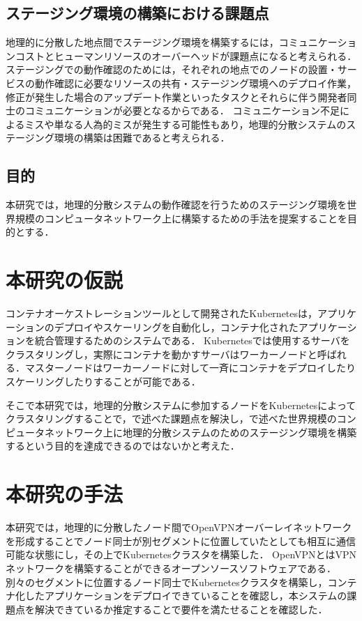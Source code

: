 \subsection{ステージング環境の構築における課題点}
地理的に分散した地点間でステージング環境を構築するには，コミュニケーションコストとヒューマンリソースのオーバーヘッドが課題点になると考えられる．
ステージングでの動作確認のためには，それぞれの地点でのノードの設置・サービスの動作確認に必要なリソースの共有・ステージング環境へのデプロイ作業，修正が発生した場合のアップデート作業といったタスクとそれらに伴う開発者同士のコミュニケーションが必要となるからである．
コミュニケーション不足によるミスや単なる人為的ミスが発生する可能性もあり，地理的分散システムのステージング環境の構築は困難であると考えられる．

\subsection{目的}
本研究では，地理的分散システムの動作確認を行うためのステージング環境を世界規模のコンピュータネットワーク上に構築するための手法を提案することを目的とする．

\section{本研究の仮説}
コンテナオーケストレーションツールとして開発されたKubernetesは，アプリケーションのデプロイやスケーリングを自動化し，コンテナ化されたアプリケーションを統合管理するためのシステムである．
Kubernetesでは使用するサーバをクラスタリングし，実際にコンテナを動かすサーバはワーカーノードと呼ばれる．マスターノードはワーカーノードに対して一斉にコンテナをデプロイしたりスケーリングしたりすることが可能である．

そこで本研究では，地理的分散システムに参加するノードをKubernetesによってクラスタリングすることで，{}で述べた課題点を解決し，{}で述べた世界規模のコンピュータネットワーク上に地理的分散システムのためのステージング環境を構築するという目的を達成できるのではないかと考えた．

\section{本研究の手法}
本研究では，地理的に分散したノード間でOpenVPNオーバーレイネットワークを形成することでノード同士が別セグメントに位置していたとしても相互に通信可能な状態にし，その上でKubernetesクラスタを構築した．
OpenVPNとはVPNネットワークを構築することができるオープンソースソフトウェアである．
別々のセグメントに位置するノード同士でKubernetesクラスタを構築し，コンテナ化したアプリケーションをデプロイできていることを確認し，本システムの課題点を解決できているか推定することで要件を満たせることを確認した．


